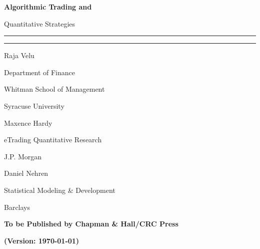{\bfseries\Huge Algorithmic Trading and \par Quantitative Strategies}

\noindent\rule{\textwidth}{0.5pt} \par
\vspace{-0.3cm}\noindent\rule{0.25\textwidth}{4pt}


\vspace{0.5cm} 
\begin{minipage}{0.3\textwidth}
\large Raja Velu \par
{\scriptsize
Department of Finance \par
Whitman School of Management \par
Syracuse University \par
}
\end{minipage}%
\begin{minipage}{0.3\textwidth}
\large Maxence Hardy \par
{\scriptsize
eTrading Quantitative Research \par
J.P. Morgan \par
}
\end{minipage}%
\begin{minipage}{0.35\textwidth}
\large Daniel Nehren \par
{\scriptsize
Statistical Modeling \& Development \par 
Barclays \par
}
\end{minipage} \vfill

\begin{center} {\bfseries \Large To be Published by Chapman \& Hall/CRC Press} \end{center}

\vfill
\begin{center} \Huge {\bfseries (Version: \today)} \end{center}